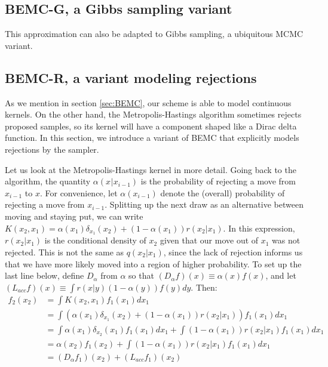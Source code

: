 \documentclass{article}
\begin{document}
\subsection{BEMC-G, a Gibbs sampling variant}
\label{sec:BEMC-G}
This approximation can also be adapted to Gibbs sampling, a ubiquitous MCMC variant. 

\subsection{BEMC-R, a variant modeling rejections}
\label{sec:BEMC-R}

As we mention in section \ref{sec:BEMC}, our scheme is able to model continuous kernels. On the other hand, the Metropolis-Hastings algorithm sometimes rejects proposed samples, so its kernel will have a component shaped like a Dirac delta function. In this section, we introduce a variant of BEMC that explicitly models rejections by the sampler. 

Let us look at the Metropolis-Hastings kernel in more detail. Going back to the algorithm, the quantity $\alpha(x_{}|x_{i-1})$ is the probability of rejecting a move from $x_{i-1}$ to $x$. For convenience, let $\alpha(x_{i-1})$ denote the (overall) probability of rejecting a move from $x_{i-1}$. Splitting up the next draw as an alternative between moving and staying put, we can write $K(x_2, x_1) = \alpha(x_1)\delta_{x_1}(x_2) + (1-\alpha(x_1))r(x_2|x_1)$. In this expression, $r(x_2|x_1)$ is the conditional density of $x_2$ given that our move out of $x_1$ was not rejected. This is not the same as $q(x_2|x_1)$, since the lack of rejection informs us that we have more likely moved into a region of higher probability. To set up the last line below, define $D_{\alpha}$ from $\alpha$ so that $(D_{\alpha}f)(x)\equiv \alpha(x)f(x)$, and let $(L_{acc}f)(x)\equiv \int r(x|y)(1-\alpha(y))f(y)dy$. Then:
\begin{align*}
 f_2(x_2) &= \int K(x_2, x_1)f_1(x_1)dx_1 \\
&= \int (\alpha(x_1)\delta_{x_1}(x_2) + (1-\alpha(x_1))r(x_2|x_1))f_1(x_1)dx_1 \\
&= \int \alpha(x_1)\delta_{x_2}(x_1)f_1(x_1)dx_1 + \int (1-\alpha(x_1))r(x_2|x_1)f_1(x_1)dx_1 \\
&=  \alpha(x_2)f_1(x_2) + \int (1-\alpha(x_1))r(x_2|x_1)f_1(x_1)dx_1 \\
&=  (D_{\alpha}f_1)(x_2) + (L_{acc}f_1)(x_2) \\
\end{align*}
\end{document}
